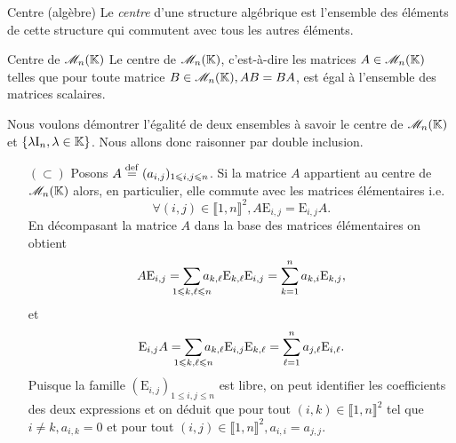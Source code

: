 \begin{defi}{Centre (algèbre)}
    Le \emph{centre} d'une structure algébrique est l'ensemble des éléments de cette structure qui commutent avec tous les autres éléments. 
\end{defi}

\begin{prop}{Centre de $\mathscr{M}_n(\mathbb{K})$}
Le centre de $\mathscr{M}_n(\mathbb{K})$, c'est-à-dire les matrices $A \in \mathscr{M}_n(\mathbb{K})$ telles que pour toute matrice $B \in \mathscr{M}_n(\mathbb{K}), AB = BA$, est égal à l'ensemble des matrices scalaires.
\end{prop}

Nous voulons démontrer l'égalité de deux ensembles à savoir le centre de $\mathscr{M}_n(\mathbb{K})$ et $\{ \lambda \mathrm{I}_n, \lambda \in \mathbb{K} \}$. Nous allons donc raisonner par double inclusion. 
\begin{preuve}
    \begin{itemize}
        \item[$(\subset)$] Posons $A \overset{\mathrm{\tiny def}}{=} (a_{i,j})_{1 \leqslant i, j \leqslant n}$. Si la matrice $A$ appartient au centre de $\mathscr{M}_n(\mathbb{K})$ alors, en particulier, elle commute avec les matrices élémentaires \note i.e. 
        $$\forall (i, j) \in \llbracket 1, n \rrbracket^2, A \mathrm{E}_{i,j} = \mathrm{E}_{i,j} A.$$
        En décompasant la matrice $A$ dans la base des matrices élémentaires on obtient
        $$A \mathrm{E}_{i,j} = \smashoperator{\sum_{1 \leqslant k, \ell \leqslant n}} a_{k, \ell} \mathrm{E}_{k,\ell} \mathrm{E}_{i,j} = \sum_{k=1}^{n} a_{k,i} \mathrm{E}_{k,j},$$
        et
        $$\mathrm{E}_{i,j} A = \smashoperator{\sum_{1 \leqslant k, \ell \leqslant n}} a_{k, \ell} \mathrm{E}_{i,j} \mathrm{E}_{k,\ell} = \sum_{\ell=1}^{n} a_{j,\ell} \mathrm{E}_{i,\ell}.$$
        Puisque la famille $(\mathrm{E}_{i, j})_{1 \leqslant i, j \leqslant n}$ est libre, on peut identifier les coefficients des deux expressions et on déduit que pour tout $(i, k) \in \llbracket 1, n \rrbracket^2$ tel que $i \not= k, a_{i,k}=0$ et pour tout $(i,j) \in \llbracket 1, n \rrbracket^2, a_{i,i}=a_{j,j}$. \\

\end{itemize}
\end{preuve}
